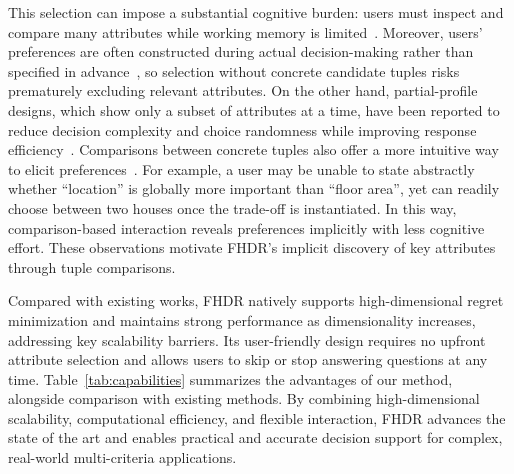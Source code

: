 \documentclass[conference]{IEEEtran}
\theoremstyle{definition}
\theoremstyle{plain}
\begin{document}
This selection can impose a substantial cognitive burden: users must inspect and compare many attributes while working memory is limited~\cite{Cowan_2001}. Moreover, users’ preferences are often constructed during actual decision-making rather than specified in advance~\cite{Slovic1995}, so selection without concrete candidate tuples risks prematurely excluding relevant attributes. On the other hand, partial-profile designs, which show only a subset of attributes at a time, have been reported to reduce decision complexity and choice randomness while improving response efficiency~\cite{meyerhoff_performance_2023}. Comparisons between concrete tuples also offer a more intuitive way to elicit preferences~\cite{NL12, XCL19, WWX21, CW23}. For example, a user may be unable to state abstractly whether ``location'' is globally more important than ``floor area'', yet can readily choose between two houses once the trade-off is instantiated. In this way, comparison-based interaction reveals preferences implicitly with less cognitive effort. These observations motivate FHDR’s implicit discovery of key attributes through tuple comparisons.

Compared with existing works, FHDR natively supports high-dimensional regret minimization and maintains strong performance as dimensionality increases, addressing key scalability barriers. Its user-friendly design requires no upfront attribute selection and allows users to skip or stop answering questions at any time. Table~\ref{tab:capabilities} summarizes the advantages of our method, alongside comparison with existing methods. By combining high-dimensional scalability, computational efficiency, and flexible interaction, FHDR advances the state of the art and enables practical and accurate decision support for complex, real-world multi-criteria applications.
\end{document}
